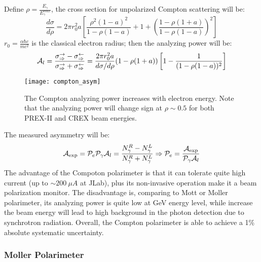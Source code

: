 Define $\rho = \frac{E_\gamma}{E_\gamma^{max}}$, the cross section for unpolarized
Compton scattering will be:
\begin{equation}
    \frac{d\sigma}{d\rho} = 2\pi r_0^2 a 
    \left[ \frac{\rho^2 (1-a)^2}{1 - \rho(1-a)} + 1 + \left( \frac{1 - \rho(1+a)}{1- \rho(1-a)}\right)^2\right]
\end{equation}
$r_0 = \frac{\alpha \hbar c}{mc^2}$ is the classical electron radius; then the
analyzing power will be:
\begin{equation}
    \mathcal{A}_l = \frac{\sigma^\rightarrow_\Rightarrow - \sigma^\leftarrow_\Rightarrow}
    {\sigma^\rightarrow_\Rightarrow + \sigma^\leftarrow_\Rightarrow}
    = \frac{2\pi r_0^2 a}{d\sigma/d\rho}(1 - \rho(1+a))\left[ 1 - \frac{1}{(1 - \rho(1-a))^2}\right]
\end{equation}
\begin{figure}
    \centering
    \texttt{[image: compton\_asym]}
    \caption{The Compton analyzing power increases with electron energy. Note
    that the analyzing power will change sign at $\rho \sim 0.5$ for both PREX-II
    and CREX beam energies.}
\end{figure}

The measured asymmetry will be:
\begin{equation*}
    \mathcal{A}_{\text{exp}} = \mathcal{P}_{e}\mathcal{P}_{\gamma}\mathcal{A}_{l} = \frac{N_{\gamma}^R - N_{\gamma}^L}{N_{\gamma}^R + N_{\gamma}^L}
    \Rightarrow
    \mathcal{P}_e = \frac{\mathcal{A}_{\text{exp}}}{\mathcal{P}_{\gamma}\mathcal{A}_{l}}
\end{equation*}
The advantage of the Compoton polarimeter is that it can tolerate quite high current
(up to $\sim 200 \ \mu A$ at JLab), plus its non-invasive operation make it a beam 
polarization monitor. The disadvantage is, comparing to Mott or Moller polarimeter,
its analyzing power is quite low at GeV energy level, while increase the beam
energy will lead to high background in the photon detection due to synchrotron 
radiation. Overall, the Compton polarimeter is able to achieve a 1\% absolute systematic
uncertainty.

\subsubsection{Moller Polarimeter}
\begin{comment}
low current only
\end{comment}

